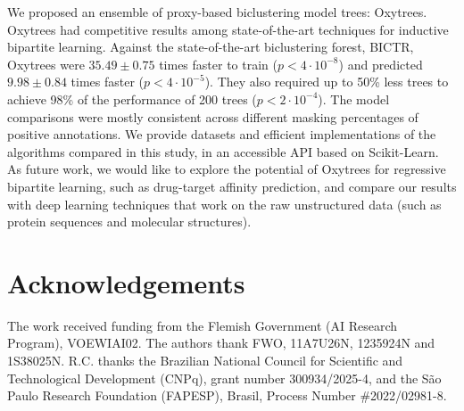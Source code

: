 \documentclass[letterpaper]{article}
\begin{document}
We proposed an ensemble of proxy-based biclustering model trees: Oxytrees.
Oxytrees had competitive results among state-of-the-art techniques for inductive bipartite learning.
Against the state-of-the-art biclustering forest, BICTR, Oxytrees were $35.49 \pm 0.75$ times faster to train ($p < 4 \cdot 10^{-8}$) and predicted $9.98 \pm 0.84$ times faster ($p < 4 \cdot 10^{-5}$). They also required up to 50\% less trees to achieve 98\% of the performance of 200 trees ($p < 2 \cdot 10^{-4}$).
The model comparisons were mostly consistent across different masking percentages of positive annotations.
We provide datasets and efficient implementations of the algorithms compared in this study, in an accessible API based on Scikit-Learn.
As future work, we would like to explore the potential of Oxytrees for regressive bipartite learning, such as drug-target affinity prediction, and compare our results with deep learning techniques that work on the raw unstructured data (such as protein sequences and molecular structures).

\section*{Acknowledgements}
The work received funding from the Flemish Government (AI Research Program), VOEWIAI02.
The authors thank FWO, 11A7U26N, 1235924N and 1S38025N.
R.C. thanks the Brazilian National Council for Scientific and Technological Development (CNPq), grant number 300934/2025-4, and the São Paulo Research Foundation (FAPESP), Brasil, Process Number \#2022/02981-8.

\FloatBarrier


\vfill
\end{document}
